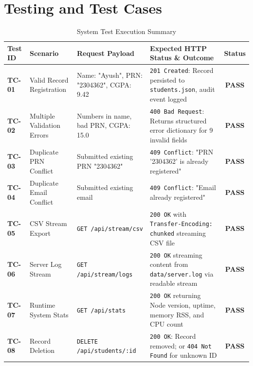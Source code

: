 \documentclass[11pt,a4paper]{article}
\begin{document}
\newpage

\section{Testing and Test Cases}

\begin{table}[htbp]
\centering
\small
\renewcommand{\arraystretch}{1.3}
\begin{tabularx}{\textwidth}{l p{2.8cm} p{3.2cm} X c}
\toprule
\textbf{Test ID} & \textbf{Scenario} & \textbf{Request Payload} & \textbf{Expected HTTP Status \& Outcome} & \textbf{Status} \\
\midrule
\textbf{TC-01} & Valid Record Registration & Name: "Ayush", PRN: "2304362", CGPA: 9.42 & \texttt{201 Created}: Record persisted to \texttt{students.json}, audit event logged & \textbf{PASS} \\
\textbf{TC-02} & Multiple Validation Errors & Numbers in name, bad PRN, CGPA: 15.0 & \texttt{400 Bad Request}: Returns structured error dictionary for 9 invalid fields & \textbf{PASS} \\
\textbf{TC-03} & Duplicate PRN Conflict & Submitted existing PRN "2304362" & \texttt{409 Conflict}: "PRN '2304362' is already registered" & \textbf{PASS} \\
\textbf{TC-04} & Duplicate Email Conflict & Submitted existing email & \texttt{409 Conflict}: "Email already registered" & \textbf{PASS} \\
\textbf{TC-05} & CSV Stream Export & \texttt{GET /api/stream/csv} & \texttt{200 OK} with \texttt{Transfer-Encoding: chunked} streaming CSV file & \textbf{PASS} \\
\textbf{TC-06} & Server Log Stream & \texttt{GET /api/stream/logs} & \texttt{200 OK} streaming content from \texttt{data/server.log} via readable stream & \textbf{PASS} \\
\textbf{TC-07} & Runtime System Stats & \texttt{GET /api/stats} & \texttt{200 OK} returning Node version, uptime, memory RSS, and CPU count & \textbf{PASS} \\
\textbf{TC-08} & Record Deletion & \texttt{DELETE /api/students/:id} & \texttt{200 OK}: Record removed; or \texttt{404 Not Found} for unknown ID & \textbf{PASS} \\
\bottomrule
\end{tabularx}
\caption{System Test Execution Summary}
\end{table}
\end{document}

